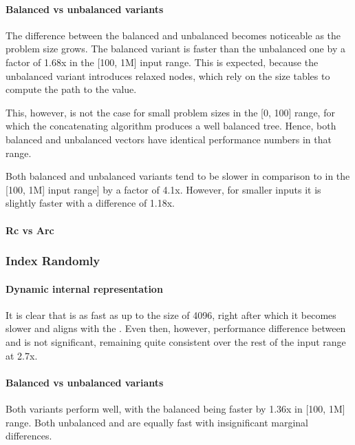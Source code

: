 \paragraph{Balanced vs unbalanced variants}
The difference between the balanced and unbalanced \rrbvec{} becomes noticeable as the problem size grows. The balanced variant is faster than the unbalanced one by a factor of 1.68x in the [100, 1M] input range. This is expected, because the unbalanced variant introduces relaxed nodes, which rely on the size tables to compute the path to the value. 

This, however, is not the case for small problem sizes in the [0, 100] range, for which the concatenating algorithm produces a well balanced tree. Hence, both balanced and unbalanced vectors have identical performance numbers in that range. 

Both balanced and unbalanced \imrsvec{} variants tend to be slower in comparison to \rrbvec{} in the [100, 1M] input range] by a factor of 4.1x. However, for smaller inputs it is slightly faster with a difference of 1.18x. 


\paragraph*{Rc vs Arc}

\subsubsection*{Index Randomly}


\paragraph*{Dynamic internal representation}
It is clear that \pvec{} is as fast as \stdvec{} up to the size of 4096, right after which it becomes slower and aligns with the \rrbvec{}. Even then, however, performance difference between \stdvec{} and \pvec{} is not significant, remaining quite consistent over the rest of the input range at 2.7x. 

\paragraph*{Balanced vs unbalanced variants}
Both variants perform well, with the balanced \rrbvec{} being faster by 1.36x in [100, 1M] range. Both unbalanced \rrbvec{} and \imrsvec{} are equally fast with insignificant marginal differences.

